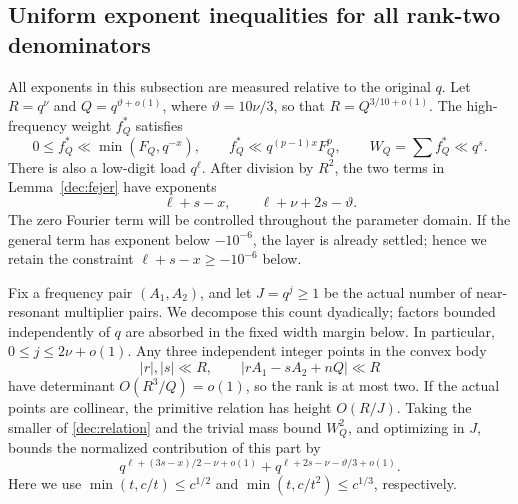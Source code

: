 \documentclass[11pt,a4paper]{article}
\theoremstyle{paperplain}
\numberwithin{equation}{section}
\begin{document}
\subsection{Uniform exponent inequalities for all rank-two denominators}
\label{dec:ranktwo}

All exponents in this subsection are measured relative to the original
$q$. Let $R=q^\nu$ and $Q=q^{\vartheta+o(1)}$, where
$\vartheta=10\nu/3$, so that $R=Q^{3/10+o(1)}$.
The high-frequency weight $f_Q^*$ satisfies
\begin{equation}\label{dec:highweight}
 0\le f_Q^*\ll\min(F_Q,q^{-x}),\qquad
 f_Q^*\ll q^{(p-1)x}F_Q^p,\qquad
 W_Q=\sum f_Q^*\ll q^s.
\end{equation}
There is also a low-digit load $q^\ell$.
After division by $R^2$, the two terms in Lemma~\ref{dec:fejer}
have exponents
\begin{equation}\label{dec:generaltargets}
 \ell+s-x,\qquad \ell+\nu+2s-\vartheta.
\end{equation}
The zero Fourier term will be controlled throughout the parameter domain.
If the general term has exponent below $-10^{-6}$, the layer is already
settled; hence we retain the constraint $\ell+s-x\ge-10^{-6}$ below.

Fix a frequency pair $(A_1,A_2)$, and let $J=q^j\ge1$ be the actual
number of near-resonant multiplier pairs. We decompose this count
dyadically; factors bounded independently of $q$ are absorbed in the
fixed width margin below. In particular, $0\le j\le2\nu+o(1)$. Any three independent integer
points in the convex body
\[
 |r|,|s|\ll R,\qquad |rA_1-sA_2+nQ|\ll R
\]
have determinant $O(R^3/Q)=o(1)$, so the rank is at most two.
If the actual points are collinear, the primitive relation has height
$O(R/J)$. Taking the smaller of \eqref{dec:relation} and the trivial
mass bound $W_Q^2$, and optimizing in $J$, bounds the normalized
contribution of this part by
\begin{equation}\label{dec:linetargets}
 q^{\ell+(3s-x)/2-\nu+o(1)}+
 q^{\ell+2s-\nu-\vartheta/3+o(1)}.
\end{equation}
Here we use $\min(t,c/t)\le c^{1/2}$ and
$\min(t,c/t^2)\le c^{1/3}$, respectively.
\end{document}
